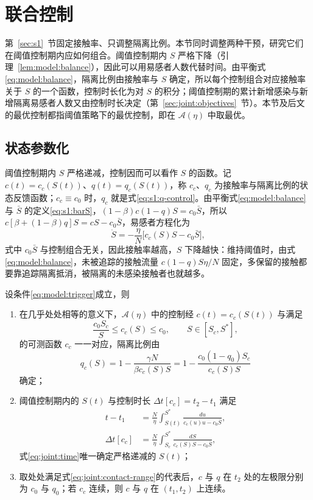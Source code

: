 \section{联合控制}
\label{sec:joint}
第~\ref{sec:s1}~节固定接触率、只调整隔离比例。本节同时调整两种干预，研究它们在阈值控制期内应如何组合。阈值控制期内 $S$ 严格下降（引理~\ref{lem:model:balance}），因此可以用易感者人数代替时间。由平衡式\eqref{eq:model:balance}，隔离比例由接触率与 $S$ 确定，所以每个控制组合对应接触率关于 $S$ 的一个函数，控制时长化为对 $S$ 的积分；阈值控制期的累计新增感染与新增隔离易感者人数又由控制时长决定（第~\ref{sec:joint:objectives}~节）。本节及后文的最优控制都指阈值策略下的最优控制，即在 $\mathcal A(\eta)$ 中取最优。

\subsection{状态参数化}
\label{sec:joint:state}
阈值控制期内 $S$ 严格递减，控制因而可以看作 $S$ 的函数。记 $c(t)=c_c(S(t))$、$q(t)=q_c(S(t))$，称 $c_c$、$q_c$ 为接触率与隔离比例的状态反馈函数；$c_c\equiv c_0$ 时，$q_c$ 就是式\eqref{eq:s1:q-control}。由平衡式\eqref{eq:model:balance}与 $\bar S$ 的定义\eqref{eq:s1:barS}，$(1-\beta)c(1-q)S=c_0\bar S$，所以 $c[\beta+(1-\beta)q]S=cS-c_0\bar S$，易感者方程化为
\begin{equation}
\dot S=-\frac{\eta}{N}\bigl[c_c(S)S-c_0\bar S\bigr],
\label{eq:joint:Sdot}
\end{equation}
式中 $c_0\bar S$ 与控制组合无关，因此接触率越高，$S$ 下降越快：维持阈值时，由式\eqref{eq:model:balance}，未被追踪的接触流量 $c(1-q)S\eta/N$ 固定，多保留的接触都要靠追踪隔离抵消，被隔离的未感染接触者也就越多。
\begin{theorem}
\label{thm:joint:representation}
设条件\eqref{eq:model:trigger}成立，则
\begin{enumerate}
\renewcommand{\labelenumi}{(\roman{enumi})}
\item 在几乎处处相等的意义下，$\mathcal A(\eta)$ 中的控制经 $c(t)=c_c(S(t))$ 与满足
\begin{equation}
\frac{c_0S_c}{S}\le c_c(S)\le c_0,\qquad S\in[S_c,S^*],
\label{eq:joint:contact-range}
\end{equation}
的可测函数 $c_c$ 一一对应，隔离比例由
\begin{equation}
q_c(S)=1-\frac{\gamma N}{\beta c_c(S)S}
      =1-\frac{c_0(1-q_0)S_c}{c_c(S)S}
\label{eq:joint:q}
\end{equation}
确定；
\item 阈值控制期内的 $S(t)$ 与控制时长 $\Delta t[c_c]=t_2-t_1$ 满足
\begin{align}
t-t_1&=\frac{N}{\eta}\int_{S(t)}^{S^*}
\frac{du}{c_c(u)u-c_0\bar S},\label{eq:joint:time}\\
\Delta t[c_c]&=\frac{N}{\eta}\int_{S_c}^{S^*}
\frac{dS}{c_c(S)S-c_0\bar S},\label{eq:joint:duration}
\end{align}
式\eqref{eq:joint:time}唯一确定严格递减的 $S(t)$；
\item 取处处满足式\eqref{eq:joint:contact-range}的代表后，$c$ 与 $q$ 在 $t_2$ 处的左极限分别为 $c_0$ 与 $q_0$；若 $c_c$ 连续，则 $c$ 与 $q$ 在 $(t_1,t_2)$ 上连续。
\end{enumerate}
\end{theorem}
